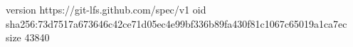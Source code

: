 version https://git-lfs.github.com/spec/v1
oid sha256:73d7517a673646c42ce71d05ec4e99bf336b89fa430f81c1067c65019a1ca7ec
size 43840
